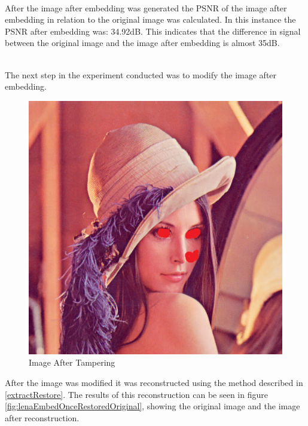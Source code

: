 \documentclass[12pt]{article}
\begin{document}
\hspace{0pt} \\
After the image after embedding was generated the PSNR of the image after embedding in relation to the original image was calculated.
In this instance the PSNR after embedding was: 34.92dB.
This indicates that the difference in signal between the original image and the image after embedding is almost 35dB.

\hspace{0pt} \\
The next step in the experiment conducted was to modify the image after embedding.
\begin{figure}[h]
	\centerline{%
	\includegraphics[scale=0.45]{"Lena Embed once 0.7 threshold/finalImage - Copy"}%
	}%
	\caption{Image After Tampering}
	\label{fig:lenaEmbedOnceTampered}
\end{figure}
After the image was modified it was reconstructed using the method described in \ref{extractRestore}.
The results of this reconstruction can be seen in figure \ref{fig:lenaEmbedOnceRestoredOriginal}, showing the original image and the image after reconstruction.
\end{document}
